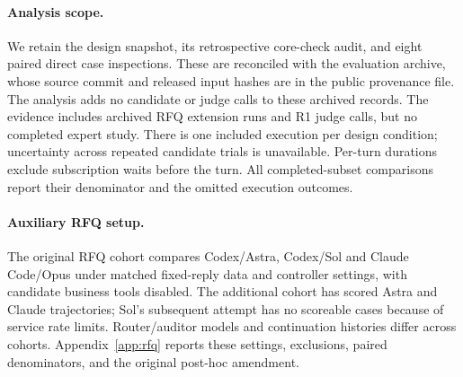 \paragraph{Analysis scope.}
We retain the design snapshot, its retrospective core-check audit, and eight paired direct case inspections. These are reconciled with the evaluation archive, whose source commit and released input hashes are in the public provenance file. The analysis adds no candidate or judge calls to these archived records. The evidence includes archived RFQ extension runs and R1 judge calls, but no completed expert study. There is one included execution per design condition; uncertainty across repeated candidate trials is unavailable. Per-turn durations exclude subscription waits before the turn. All completed-subset comparisons report their denominator and the omitted execution outcomes.

\paragraph{Auxiliary RFQ setup.}
The original RFQ cohort compares Codex/Astra, Codex/Sol and Claude Code/Opus under matched fixed-reply data and controller settings, with candidate business tools disabled. The additional cohort has scored Astra and Claude trajectories; Sol's subsequent attempt has no scoreable cases because of service rate limits. Router/auditor models and continuation histories differ across cohorts. Appendix~\ref{app:rfq} reports these settings, exclusions, paired denominators, and the original post-hoc amendment.
